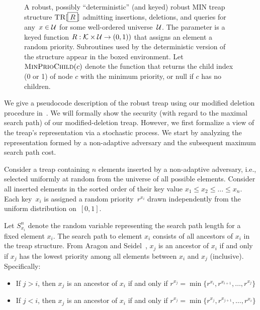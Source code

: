 \begin{figure*}[thp]
\begin{pchstack}[boxed,center,space=0.5em]
            \end{pchstack}
      \caption[A Robust Treap.]{A robust, possibly ``deterministic'' (and keyed) robust MIN treap structure $\textnormal{\textsc{TR}}[\boxed{R}]$ admitting insertions, deletions, and queries for any~$x \in \mathcal{U}$ for some well-ordered universe~$\mathcal{U}$. The parameter is a keyed function $R: \mathcal{K} \times \mathcal{U} \to (0,1))$ that assigns an element a random priority. Subroutines used by the deterministic version of the structure appear in the boxed environment. Let $\textnormal{\textsc{MinPrioChild}}(c)$ denote the function that returns the child index (0 or 1) of node $c$ with the minimum priority, or null if $c$ has no children.} 
      \label{fig:rtreap}
    \end{figure*}

We give a pseudocode description of the robust treap using our modified deletion procedure in~. We will formally show the security (with regard to the maximal search path) of our modified-deletion treap. However, we first formalize a view of the treap's representation via a stochastic process. We start by analyzing the representation formed by a non-adaptive adversary and the subsequent maximum search path cost. 

Consider a treap containing $n$ elements inserted by a non-adaptive adversary, i.e., selected uniformly at random from the universe of all possible elements. Consider all inserted elements in the sorted order of their key value $x_1 \leq x_2 \leq \ldots \leq x_n$. Each key~$x_i$ is assigned a random priority~$r^{x_{i}}$ drawn independently from the uniform distribution on~$[0,1]$. 

Let $S^n_{x_i}$ denote the random variable representing the search path length for a fixed element $x_i$. The search path to element $x_i$ consists of all ancestors of $x_i$ in the treap structure. From Aragon and Seidel~\cite{aragon1989randomized}, $x_j$ is an ancestor of $x_i$ if and only if $x_j$ has the lowest priority among all elements between $x_i$ and $x_j$ (inclusive). Specifically:

\begin{itemize}
    \item If $j > i$, then $x_j$ is an ancestor of $x_i$ if and only if $r^{x_j} = \min\{r^{x_i}, r^{x_{i+1}}, \ldots, r^{x_j}\}$
    \item If $j < i$, then $x_j$ is an ancestor of $x_i$ if and only if $r^{x_j} = \min\{r^{x_j}, r^{x_{j+1}}, \ldots, r^{x_i}\}$
\end{itemize}


